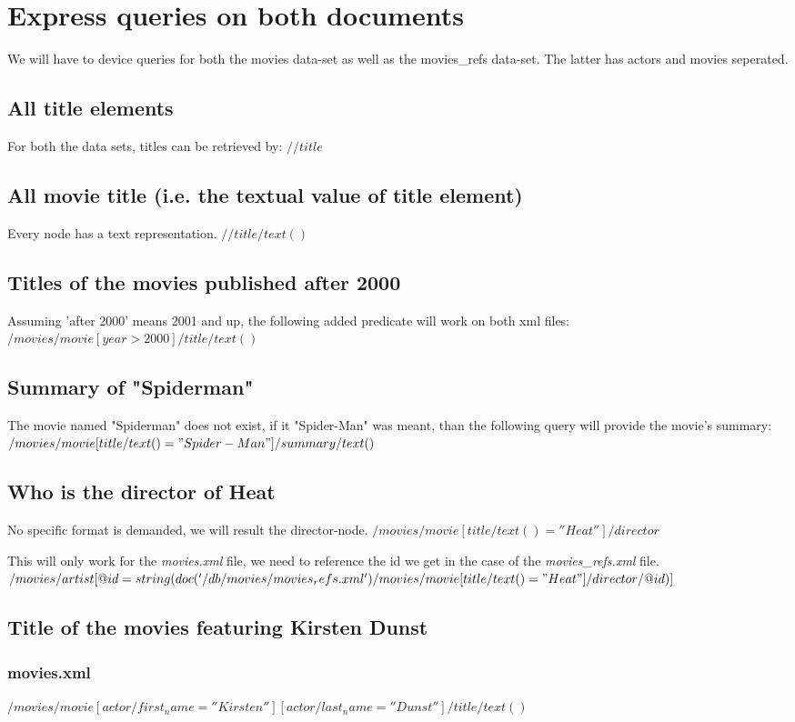 \section{Express queries on both documents}
We will have to device queries for both the movies data-set as well as
the movies_refs data-set. The latter has actors and movies seperated.
\subsection{All title elements}
For both the data sets, titles can be retrieved by:
$//title$
\subsection{All movie title (i.e. the textual value of title element)}
Every node has a text representation.
$//title/text()$
\subsection{Titles of the movies published after 2000}
Assuming 'after 2000' means 2001 and up, the following added predicate
will work on both xml files:
$/movies/movie[year>2000]/title/text()$
\subsection{Summary of "Spiderman"}
The movie named "Spiderman" does not exist, if it "Spider-Man" was
meant, than the following query will provide the movie's summary:
$/movies/movie[title/text()="Spider-Man"]/summary/text()$
\subsection{Who is the director of Heat}
No specific format is demanded, we will result the director-node.
$/movies/movie[title/text()=''Heat'']/director$

This will only work for the \emph{movies.xml} file, we need to
reference the id we get in the case of the \emph{movies_refs.xml} file.
$/movies/artist[@id=string(doc('/db/movies/movies_refs.xml')/movies/movie[title/text()="Heat"]/director/@id)]$
\subsection{Title of the movies featuring Kirsten Dunst}
\subsubsection{movies.xml}
$/movies/movie[actor/first_name=''Kirsten''][actor/last_name=''Dunst'']/title/text()$
